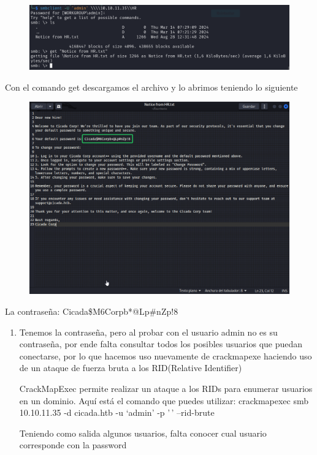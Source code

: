 \documentclass[
  letterpaper,
  DIV=11,
  numbers=noendperiod]{scrreprt}
\begin{document}
\begin{figure}

{\centering \includegraphics{Unidades/unidad10/imagenes/7.png}

}

\end{figure}

Con el comando get descargamos el archivo y lo abrimos teniendo lo
siguiente

\begin{figure}

{\centering \includegraphics{Unidades/unidad10/imagenes/8.png}

}

\end{figure}

La contraseña: Cicada\$M6Corpb*@Lp\#nZp!8

\begin{enumerate}
\def\labelenumi{\arabic{enumi})}
\setcounter{enumi}{5}
\item
  Tenemos la contraseña, pero al probar con el usuario admin no es su
  contraseña, por ende falta consultar todos los posibles usuarios que
  puedan conectarse, por lo que hacemos uso nuevamente de crackmapexe
  haciendo uso de un ataque de fuerza bruta a los RID(Relative
  Identifier)

  CrackMapExec permite realizar un ataque a los RIDs para enumerar
  usuarios en un dominio. Aquí está el comando que puedes utilizar:
  crackmapexec smb 10.10.11.35 -d cicada.htb -u `admin' -p '\,'
  --rid-brute

  Teniendo como salida algunos usuarios, falta conocer cual usuario
  corresponde con la password
\end{enumerate}
\end{document}
